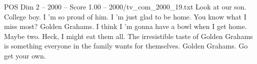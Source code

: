 \begin{textsample}{POS Dim 2 – 2000 – Score 1.00 – 2000/tv\_com\_2000\_19.txt}  \label{ex:f2_pos_082}
Look at our son.
College boy.
I 'm so proud of him.
I 'm just glad to be home.
You know what I miss most?
Golden Grahams.
I think I 'm gonna have a bowl when I get home.
Maybe two.
Heck, I might eat them all.
The irresistible taste of Golden Grahams is something everyone in the family wants for themselves.
Golden Grahams.
Go get your own.

\end{textsample}
